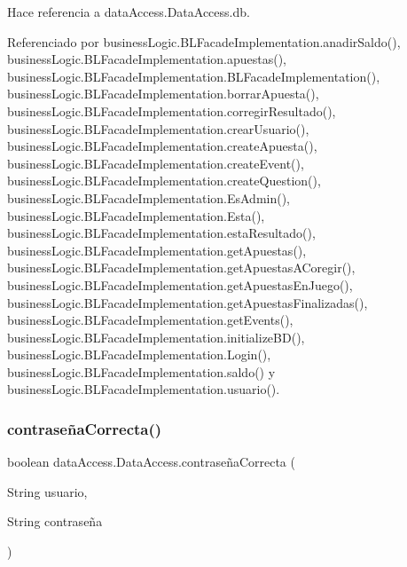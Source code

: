 Hace referencia a data\+Access.\+Data\+Access.\+db.



Referenciado por business\+Logic.\+B\+L\+Facade\+Implementation.\+anadir\+Saldo(), business\+Logic.\+B\+L\+Facade\+Implementation.\+apuestas(), business\+Logic.\+B\+L\+Facade\+Implementation.\+B\+L\+Facade\+Implementation(), business\+Logic.\+B\+L\+Facade\+Implementation.\+borrar\+Apuesta(), business\+Logic.\+B\+L\+Facade\+Implementation.\+corregir\+Resultado(), business\+Logic.\+B\+L\+Facade\+Implementation.\+crear\+Usuario(), business\+Logic.\+B\+L\+Facade\+Implementation.\+create\+Apuesta(), business\+Logic.\+B\+L\+Facade\+Implementation.\+create\+Event(), business\+Logic.\+B\+L\+Facade\+Implementation.\+create\+Question(), business\+Logic.\+B\+L\+Facade\+Implementation.\+Es\+Admin(), business\+Logic.\+B\+L\+Facade\+Implementation.\+Esta(), business\+Logic.\+B\+L\+Facade\+Implementation.\+esta\+Resultado(), business\+Logic.\+B\+L\+Facade\+Implementation.\+get\+Apuestas(), business\+Logic.\+B\+L\+Facade\+Implementation.\+get\+Apuestas\+A\+Coregir(), business\+Logic.\+B\+L\+Facade\+Implementation.\+get\+Apuestas\+En\+Juego(), business\+Logic.\+B\+L\+Facade\+Implementation.\+get\+Apuestas\+Finalizadas(), business\+Logic.\+B\+L\+Facade\+Implementation.\+get\+Events(), business\+Logic.\+B\+L\+Facade\+Implementation.\+initialize\+B\+D(), business\+Logic.\+B\+L\+Facade\+Implementation.\+Login(), business\+Logic.\+B\+L\+Facade\+Implementation.\+saldo() y business\+Logic.\+B\+L\+Facade\+Implementation.\+usuario().

\mbox{\label{classdataAccess_1_1DataAccess_a58efde6fe991961b74b803db2b25e00d}} 
\subsubsection{\texorpdfstring{contraseñaCorrecta()}{contraseñaCorrecta()}}
{\footnotesize\ttfamily boolean data\+Access.\+Data\+Access.\+contraseña\+Correcta (\begin{DoxyParamCaption}\item[{String}]{usuario,  }\item[{String}]{contraseña }\end{DoxyParamCaption})}



